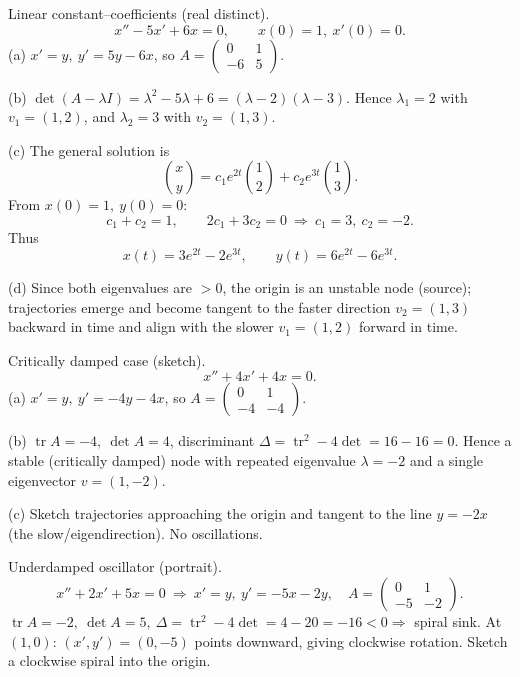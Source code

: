 \documentclass[11pt]{article}
\def\textbf#1{#1}%
\begin{document}
\begin{solution}
\textbf{Linear constant–coefficients (real distinct).}
\[
x''-5x'+6x=0,\qquad x(0)=1,\ x'(0)=0.
\]
(a) \(x'=y,\ y'=5y-6x\), so \(A=\begin{pmatrix}0&1\\-6&5\end{pmatrix}\).

(b) \(\det(A-\lambda I)=\lambda^2-5\lambda+6=(\lambda-2)(\lambda-3)\).
Hence \(\lambda_1=2\) with \(v_1=(1,2)\), and \(\lambda_2=3\) with \(v_2=(1,3)\).

(c) The general solution is
\[
\binom{x}{y}=c_1 e^{2t}\binom{1}{2}+c_2 e^{3t}\binom{1}{3}.
\]
From \(x(0)=1,\ y(0)=0\):
\[
c_1+c_2=1,\qquad 2c_1+3c_2=0\ \Rightarrow\ c_1=3,\ c_2=-2.
\]
Thus
\[
\boxed{x(t)=3e^{2t}-2e^{3t}},\qquad \boxed{y(t)=6e^{2t}-6e^{3t}}.
\]

(d) Since both eigenvalues are \(>0\), the origin is an \textbf{unstable node (source)}; trajectories emerge and become tangent to the faster direction \(v_2=(1,3)\) backward in time and align with the slower \(v_1=(1,2)\) forward in time.
\end{solution}

\begin{solution}
\textbf{Critically damped case (sketch).}
\[
x''+4x'+4x=0.
\]
(a) \(x'=y,\ y'=-4y-4x\), so \(A=\begin{pmatrix}0&1\\-4&-4\end{pmatrix}\).

(b) \(\operatorname{tr}A=-4,\ \det A=4\), discriminant \(\Delta=\operatorname{tr}^2-4\det=16-16=0\).
Hence a \textbf{stable (critically damped) node} with repeated eigenvalue \(\lambda=-2\) and a single eigenvector \(v=(1,-2)\).

(c) Sketch trajectories approaching the origin and tangent to the line \(y=-2x\) (the slow/eigendirection). No oscillations.
\end{solution}

\begin{solution}
\textbf{Underdamped oscillator (portrait).}
\[
x''+2x'+5x=0\ \Rightarrow\ x'=y,\ y'=-5x-2y,\quad
A=\begin{pmatrix}0&1\\-5&-2\end{pmatrix}.
\]
\(\operatorname{tr}A=-2,\ \det A=5,\ \Delta=\operatorname{tr}^2-4\det=4-20=-16<0\Rightarrow\) \textbf{spiral sink}.
At \((1,0)\): \((x',y')=(0,-5)\) points downward, giving \textbf{clockwise} rotation. Sketch a clockwise spiral into the origin.
\end{solution}
\end{document}
